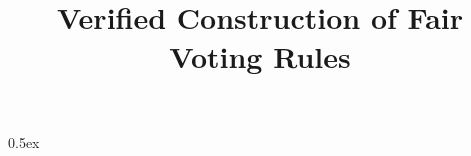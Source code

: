 \documentclass[11pt,a4paper]{article}
\begin{document}
\title{Verified Construction of Fair Voting Rules}
\author{}
\maketitle

\tableofcontents

\parindent 0pt\parskip 0.5ex



%
%
\end{document}
